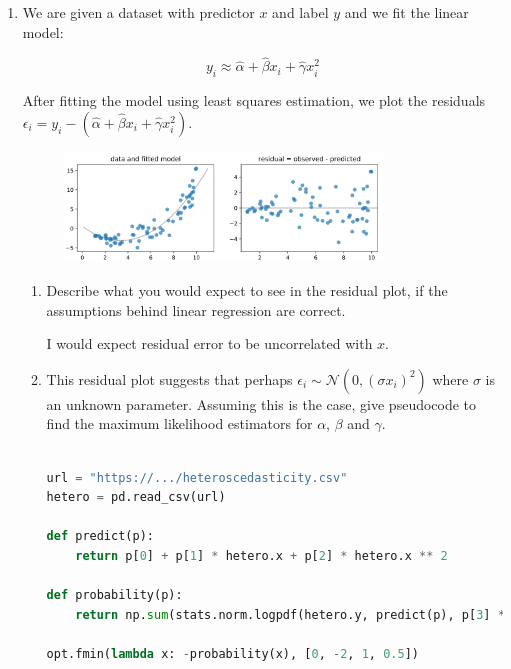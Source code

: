 \documentclass[10pt,\jkfside,a4paper]{article}
\begin{document}
\begin{enumerate}[label=\arabic*]
\item We are given a dataset with predictor $x$ and label $y$ and we fit the
linear model:

\[
y_i \approx \hat{\alpha} + \hat{\beta}x_i + \hat{\gamma}x^2_i
\]

After fitting the model using least squares estimation, we plot the
residuals $\epsilon_i = y_i - (\hat{\alpha} + \hat{\beta}x_i +
\hat{\gamma}x^2_i)$.

\begin{figure}[H]
    \centering
    \includegraphics[width=0.8\textwidth]{q13_img}
\end{figure}

\begin{enumerate}[label=(\alph*)]

\item Describe what you would expect to see in the residual plot, if the
assumptions behind linear regression are correct.

I would expect residual error to be uncorrelated with $x$.

\item This residual plot suggests that perhaps $\epsilon_i \sim \mathcal{N}
(0, (\sigma x_i)^2)$ where $\sigma$ is an unknown parameter. Assuming this
is the case, give pseudocode to find the maximum likelihood estimators for
$\alpha$, $\beta$ and $\gamma$.

\begin{lstlisting}[language=Python]

url = "https://.../heteroscedasticity.csv"
hetero = pd.read_csv(url)

def predict(p):
	return p[0] + p[1] * hetero.x + p[2] * hetero.x ** 2

def probability(p):
	return np.sum(stats.norm.logpdf(hetero.y, predict(p), p[3] * hetero.x))

opt.fmin(lambda x: -probability(x), [0, -2, 1, 0.5])

\end{lstlisting}

\end{enumerate}


\end{enumerate}
\end{document}
